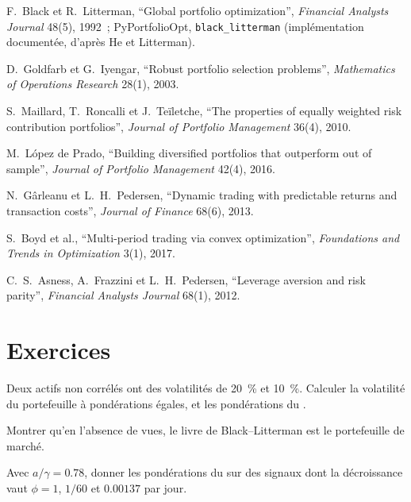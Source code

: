 \begin{omsources}
\item F.~Black et R.~Litterman, ``Global portfolio optimization'', \emph{Financial Analysts Journal} 48(5), 1992~; PyPortfolioOpt, \texttt{black\_litterman}
(implémentation documentée, d'après He et Litterman).
\item D.~Goldfarb et G.~Iyengar, ``Robust portfolio selection problems'', \emph{Mathematics of Operations Research} 28(1), 2003.
\item S.~Maillard, T.~Roncalli et J.~Teïletche, ``The properties of equally weighted risk contribution portfolios'', \emph{Journal of Portfolio Management}
36(4), 2010.
\item M.~López de Prado, ``Building diversified portfolios that outperform out of sample'', \emph{Journal of Portfolio Management} 42(4), 2016.
\item N.~Gârleanu et L.~H.~Pedersen, ``Dynamic trading with predictable returns and transaction costs'', \emph{Journal of Finance} 68(6), 2013.
\item S.~Boyd et al., ``Multi-period trading via convex optimization'', \emph{Foundations and Trends in Optimization} 3(1), 2017.
\item C.~S.~Asness, A.~Frazzini et L.~H.~Pedersen, ``Leverage aversion and risk parity'', \emph{Financial Analysts Journal} 68(1), 2012.
\end{omsources}

\section{Exercices}

\begin{exercise}[$\star$]\label{exo:rs:portfolio-construction-ii:1}
Deux actifs non corrélés ont des volatilités de 20~\% et 10~\%. Calculer la volatilité du portefeuille à pondérations égales, et les pondérations du .
\end{exercise}

\begin{exercise}[$\star$]\label{exo:rs:portfolio-construction-ii:2}
Montrer qu'en l'absence de vues, le livre de Black--Litterman est le portefeuille de marché.
\end{exercise}

\begin{exercise}[$\star$]\label{exo:rs:portfolio-construction-ii:3}
Avec $a/\gamma = 0.78$, donner les pondérations du  sur des signaux dont la décroissance vaut $\phi = 1$, $1/60$ et $0.00137$ par jour.
\end{exercise}

